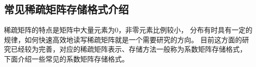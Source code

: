 \begin{comment}

\subsubsection{多重网格}

\begin{table}
\centering
\caption{不同求解算法求解2维Poisson问题需要的计算量\cite{trottenberg2000multigrid}}
\begin{minipage}{.7\linewidth}
\centering
\begin{tabular}{lc}
\topline
求解方法 & 需要的计算量\footnote{记N为未知元数量。}\\
\midline
高斯消去 & $\mathcal{O}(N^2)$\\
Jacobi迭代 & $\mathcal{O}(N^2\log\epsilon)$\\
Gauss-Seidel迭代 & $\mathcal{O}(N^2\log\epsilon)$\\
超松弛迭代 & $\mathcal{O}(N^{3/2}\log\epsilon)$\\
CG & $\mathcal{O}(N^{3/2}\log\epsilon)$\\
IC CG & $\mathcal{O}(N^{5/4}\log\epsilon)$\\
ADI & $\mathcal{O}(N\log N)$\\
完全多重网格法 & $\mathcal{O}(N)$\\
\bottomline
\end{tabular}
\end{minipage}
\end{table}

\end{comment}

\subsection{常见稀疏矩阵存储格式介绍}

稀疏矩阵的特点是矩阵中大量元素为0，非零元素比例较小，
分布有时具有一定的规律，如何快速高效地读写稀疏矩阵就是一个需要研究的方向。
目前这方面的研究已经较为完善，对应的稀疏矩阵表示、存储方法一般称为系数矩阵存储格式，
下面介绍一些常见的系数矩阵存储格式。

